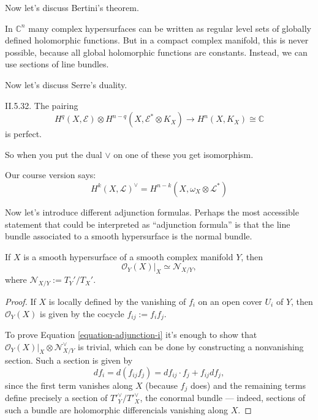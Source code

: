 \medskip\noindent
Now let's discuss Bertini's theorem.

\begin{slogan}
In \(\mathbb{C}^n\) many complex hypersurfaces can be written as regular level
sets of globally defined holomorphic functions. But in a compact complex
manifold, this is never possible, because all global holomorphic functions are
constants. Instead, we can use sections of line bundles.
\end{slogan}

\medskip\noindent
Now let's discuss Serre's duality.

\begin{theorem}
\label{theorem-serre-duality}
\cite{Voisin} II.5.32. The pairing
$$
H^q(X,\mathcal{E})\otimes
H^{n-q}(X,\mathcal{E}^*\otimes K_X)\to H^{n}(X,K_X)\cong\mathbb{C}
$$
is perfect.
\end{theorem}

So when you put the dual \(\vee\) on one of these you get isomorphism.

Our course version says:
$$
H^{k}(X,\mathcal{L})^{\vee}=H^{n-k}(X,\omega_X \otimes \mathcal{L}^*)
$$



\medskip\noindent
Now let's introduce different adjunction formulas.
Perhaps the most accessible statement that could be interpreted as ``adjunction
formula'' is that the line bundle associated to a smooth hypersurface is the
normal bundle.

\begin{theorem}
\label{theorem-adjunction-formula-i}
\begin{reference}
\cite[p.146]{GH}
\end{reference}
If $X$ is a smooth hypersurface of a smooth complex manifold $Y$, then
\begin{equation}
\label{equation-adjunction-i}
\mathcal{O}_Y(X)|_{X} \simeq \mathcal{N}_{X/Y},
\end{equation}
where $\mathcal{N}_{X/Y}:=T_Y'/T_X'$.
\end{theorem}

\begin{proof}
If $X$ is locally defined
by the vanishing of $f_i$ on an open cover $U_i$ of $Y$,
then $\mathcal{O}_Y(X)$ is given by the cocycle $f_{ij}:=f_if_j$.

To prove Equation \ref{equation-adjunction-i}
it's enough to show that $\mathcal{O}_Y(X)|_{X}\otimes \mathcal{N}^\vee_{X/Y}$ 
is trivial, which can be done by constructing a nonvanishing section.
Such a section is given by
$$
df_i=d(f_{ij}f_j)=df_{ij}\cdot f_j+f_{ij}df_j,
$$
since the first term vanishes along $X$ (because $f_j$ does)
and the remaining terms define precisely a section
of ${T'}^\vee_Y/{T'}^\vee_X$,
the conormal bundle ---
indeed, sections of such a bundle
are holomorphic differencials vanishing along $X$.
\end{proof}

